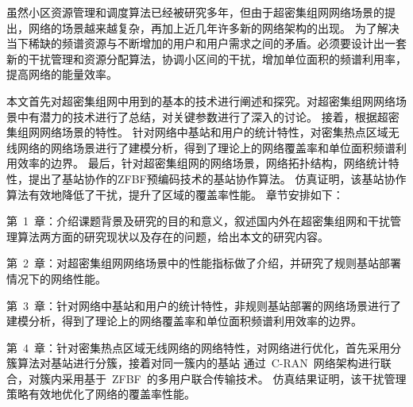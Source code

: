 虽然小区资源管理和调度算法已经被研究多年，但由于超密集组网网络场景的提出，网络的场景越来越复杂，再加上近几年许多新的网络架构的出现。
为了解决当下稀缺的频谱资源与不断增加的用户和用户需求之间的矛盾。必须要设计出一套新的干扰管理和资源分配算法，协调小区间的干扰，增加单位面积的频谱利用率，提高网络的能量效率。

本文首先对超密集组网中用到的基本的技术进行阐述和探究。对超密集组网网络场景中有潜力的技术进行了总结，对关键参数进行了深入的讨论。
接着，根据超密集组网网络场景的特性。
针对网络中基站和用户的统计特性，对密集热点区域无线网络的网络场景进行了建模分析，得到了理论上的网络覆盖率和单位面积频谱利用效率的边界。
最后，针对超密集组网的网络场景，网络拓扑结构，网络统计特性，提出了基站协作的ZFBF预编码技术的基站协作算法。
仿真证明，该基站协作算法有效地降低了干扰，提升了区域的覆盖率性能。
章节安排如下：

第~1~章：介绍课题背景及研究的目的和意义，叙述国内外在超密集组网和干扰管理算法两方面的研究现状以及存在的问题，给出本文的研究内容。

第~2~章：对超密集组网网络场景中的性能指标做了介绍，并研究了规则基站部署情况下的网络性能。

第~3~章：针对网络中基站和用户的统计特性，非规则基站部署的网络场景进行了建模分析，得到了理论上的网络覆盖率和单位面积频谱利用效率的边界。

第~4~章：针对密集热点区域无线网络的网络特性，对网络进行优化，首先采用分簇算法对基站进行分簇，接着对同一簇内的基站
通过~C-RAN~网络架构进行联合，对簇内采用基于~ZFBF~的多用户联合传输技术。
仿真结果证明，该干扰管理策略有效地优化了网络的覆盖率性能。
